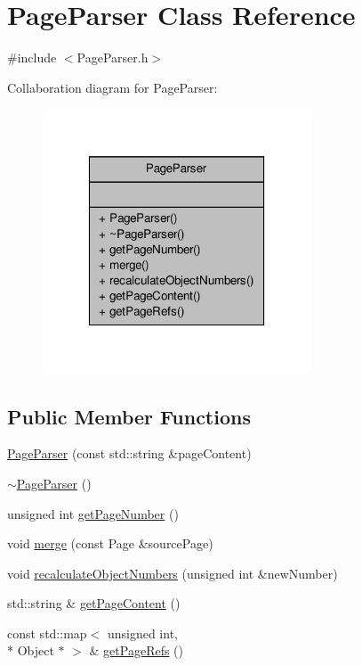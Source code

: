 \hypertarget{class_page_parser}{\section{Page\-Parser Class Reference}
\label{d5/d26/class_page_parser}
}


{\ttfamily \#include $<$Page\-Parser.\-h$>$}



Collaboration diagram for Page\-Parser\-:
\nopagebreak
\begin{figure}[H]
\begin{center}
\leavevmode
\includegraphics[width=226pt]{de/d41/class_page_parser__coll__graph}
\end{center}
\end{figure}
\subsection*{Public Member Functions}
\begin{DoxyCompactItemize}
\item 
\hyperlink{class_page_parser_a8280e215dbb412b915b30e44c072fb17}{Page\-Parser} (const std\-::string \&page\-Content)
\item 
\hyperlink{class_page_parser_ac156e0813e982b5db5dff097aa6db782}{$\sim$\-Page\-Parser} ()
\item 
unsigned int \hyperlink{class_page_parser_a4329dc3f09b85d3dfe62abd67a1523c1}{get\-Page\-Number} ()
\item 
void \hyperlink{class_page_parser_a44dcdcbc2b4deb8f1536c0f1d4febf97}{merge} (const Page \&source\-Page)
\item 
void \hyperlink{class_page_parser_a38fcf8743c96dc101239d9016f085e2e}{recalculate\-Object\-Numbers} (unsigned int \&new\-Number)
\item 
std\-::string \& \hyperlink{class_page_parser_a420a72670517354de23dbe3d9078155a}{get\-Page\-Content} ()
\item 
const std\-::map$<$ unsigned int, \\*
Object $\ast$ $>$ \& \hyperlink{class_page_parser_ab0f14670330a152cf33b1240733ba32c}{get\-Page\-Refs} ()
\end{DoxyCompactItemize}
